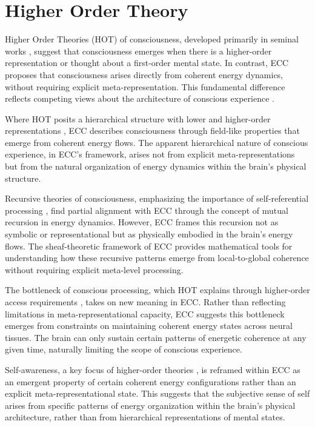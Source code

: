 \section{Higher Order Theory}

Higher Order Theories (HOT) of consciousness, developed primarily in seminal works \cite{Rosenthal2005, Armstrong1968}, suggest that consciousness emerges when there is a higher-order representation or thought about a first-order mental state. In contrast, ECC proposes that consciousness arises directly from coherent energy dynamics, without requiring explicit meta-representation. This fundamental difference reflects competing views about the architecture of conscious experience \cite{Lycan1996}.

Where HOT posits a hierarchical structure with lower and higher-order representations \cite{Carruthers2000}, ECC describes consciousness through field-like properties that emerge from coherent energy flows. The apparent hierarchical nature of conscious experience, in ECC's framework, arises not from explicit meta-representations but from the natural organization of energy dynamics within the brain's physical structure.

Recursive theories of consciousness, emphasizing the importance of self-referential processing \cite{Hofstadter2007}, find partial alignment with ECC through the concept of mutual recursion in energy dynamics. However, ECC frames this recursion not as symbolic or representational but as physically embodied in the brain's energy flows. The sheaf-theoretic framework of ECC provides mathematical tools for understanding how these recursive patterns emerge from local-to-global coherence without requiring explicit meta-level processing.

The bottleneck of conscious processing, which HOT explains through higher-order access requirements \cite{Lau2011}, takes on new meaning in ECC. Rather than reflecting limitations in meta-representational capacity, ECC suggests this bottleneck emerges from constraints on maintaining coherent energy states across neural tissues. The brain can only sustain certain patterns of energetic coherence at any given time, naturally limiting the scope of conscious experience.

Self-awareness, a key focus of higher-order theories \cite{Kriegel2009}, is reframed within ECC as an emergent property of certain coherent energy configurations rather than an explicit meta-representational state. This suggests that the subjective sense of self arises from specific patterns of energy organization within the brain's physical architecture, rather than from hierarchical representations of mental states.

